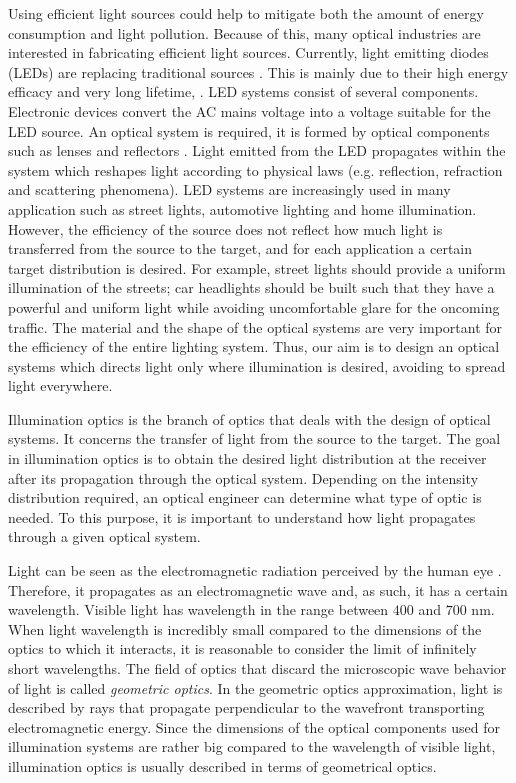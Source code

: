 Using efficient light sources could help to mitigate both the amount of energy consumption and light pollution.
Because of this, many optical industries are interested in fabricating efficient light sources.
Currently, light emitting
diodes (LEDs) are replacing traditional sources \cite{koshel2012illumination}. 
This is mainly due to their high energy efficacy and very long lifetime, \cite{taguchi2008present, haitz2011solid}. 
LED systems consist of several components. 
Electronic devices convert the AC mains voltage into a voltage suitable for the LED source.
An optical system is required, it is formed by optical components such as lenses and reflectors \cite{moreno2008modeling}. Light emitted from the LED propagates within the system which reshapes light according to physical laws (e.g. reflection, refraction and scattering phenomena). LED systems are increasingly used in many application such as street lights, automotive lighting and home illumination. 
However, the efficiency of the source does not reflect how much light is transferred from the source to the target, and for each application a certain target distribution is desired. For example, street lights should provide a uniform illumination of the streets; car headlights should be built such that they have a powerful and uniform light while avoiding uncomfortable glare for the oncoming traffic. The material and the shape of the optical systems are very important for the efficiency of the entire lighting system. Thus, our aim is to design an optical systems which directs light only where illumination is desired, avoiding to spread light everywhere.

Illumination optics is the branch of optics that deals with the design of optical systems. It concerns the transfer of light from the source to the target. The goal in illumination optics is to obtain the desired light distribution at the receiver after its propagation through the optical system. Depending on the intensity distribution required, an optical engineer can determine what type of optic is needed. To this purpose, it is important to understand how light propagates through a given optical system.

Light can be seen as the electromagnetic radiation perceived by the human eye \cite{schreuder2008outdoor}. Therefore, it propagates as an electromagnetic wave and, as such, it has a certain wavelength. Visible light has wavelength in the range between $400$ and $700$ nm. When light wavelength is incredibly small compared to the dimensions of the optics to which it interacts, it is reasonable to consider the limit of infinitely short wavelengths. The field of optics that discard the microscopic wave behavior of light is called \textit{geometric optics}. In the geometric optics approximation, light is described by rays that propagate perpendicular to the wavefront transporting electromagnetic energy. Since the dimensions of the optical components used for illumination systems are rather big compared to the wavelength of visible light, illumination optics is usually described in terms of geometrical optics. 

